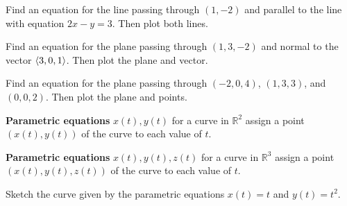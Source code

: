 \documentclass[letterpaper, twoside, 12pt]{book}
\begin{document}
          \begin{problem}
            Find an equation for the line passing through $(1,-2)$ and parallel
            to the line with equation $2x-y=3$. Then plot both lines.
          \end{problem}

          \begin{solution}

          \end{solution}

          \begin{problem}
            Find an equation for the plane passing through $(1,3,-2)$ and
            normal to the vector $\langle3,0,1\rangle$. Then plot the plane and vector.
          \end{problem}

          \begin{solution}

          \end{solution}

          \begin{problem}
            Find an equation for the plane passing through $(-2,0,4)$,
            $(1,3,3)$, and $(0,0,2)$. Then plot the plane and points.
          \end{problem}

          \begin{solution}

          \end{solution}



\begin{definition}
  \textbf{Parametric equations} $x(t),y(t)$
  for a curve in $\mathbb R^2$ assign a point $(x(t),y(t))$ of the curve
  to each value of $t$.

  \textbf{Parametric equations} $x(t),y(t),z(t)$
  for a curve in $\mathbb R^3$ assign a point $(x(t),y(t),z(t))$ of the curve
  to each value of $t$.
\end{definition}



          \begin{problem}
            Sketch the curve given by the parametric equations
            $x(t)=t$ and $y(t)=t^2$.
          \end{problem}

          \begin{solution}

          \end{solution}
\end{document}
